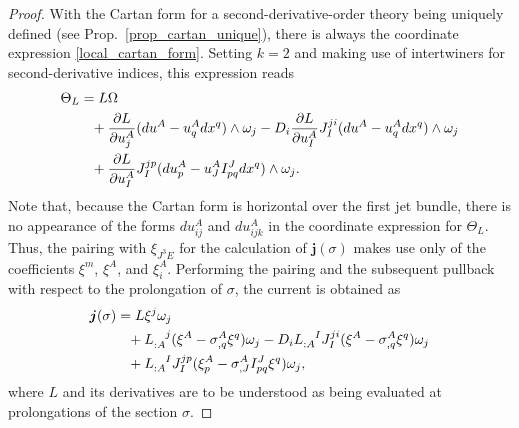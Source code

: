 \begin{proof}
  With the Cartan form for a second-derivative-order theory being uniquely defined (see Prop.~\ref{prop_cartan_unique}), there is always the coordinate expression \eqref{local_cartan_form}. Setting $k=2$ and making use of intertwiners for second-derivative indices, this expression reads
  \begin{equation}
    \begin{aligned}
      \Theta_L &{} = L\Omega \\
               &{} \hphantom{=} + \frac{\partial L}{\partial u^A_j}(du^A - u^A_q dx^q)\wedge\omega_j - D_i \frac{\partial L}{\partial u^A_I} J_I^{ji} (du^A-u^A_qdx^q)\wedge\omega_j \\
               &{} \hphantom{=} + \frac{\partial L}{\partial u^A_I} J_I^{jp} (du^A_p - u^A_J I_{pq}^J dx^q)\wedge\omega_j.
  \end{aligned}
  \end{equation}
  Note that, because the Cartan form is horizontal over the first jet bundle, there is no appearance of the forms $du^A_{ij}$ and $du^A_{ijk}$ in the coordinate expression for $\Theta_L$. Thus, the pairing with $\xi_{J^3E}$ for the calculation of $\boldsymbol{j}(\sigma)$ makes use only of the coefficients $\xi^m$, $\xi^A$, and $\xi^A_i$. Performing the pairing and the subsequent pullback with respect to the prolongation of $\sigma$, the current is obtained as
  \begin{equation}
    \begin{aligned}
      \boldsymbol{j}(\sigma) &{} = L \xi^j \omega_j \\
                             &{} \hphantom{=} + L_{:A}^{\hphantom{:A}j} (\xi^A - \sigma^A_{,q} \xi^q) \omega_j - D_i L_{:A}^{\hphantom{:A}I} J_I^{ji} (\xi^A - \sigma^A_{,q} \xi^q) \omega_j \\
                             &{} \hphantom{=} + L_{:A}^{\hphantom{:A}I} J_I^{jp} (\xi^A_p - \sigma^A_{,J}I^J_{pq}\xi^q) \omega_j,
    \end{aligned}
  \end{equation}
  where $L$ and its derivatives are to be understood as being evaluated at prolongations of the section $\sigma$.


\end{proof}
